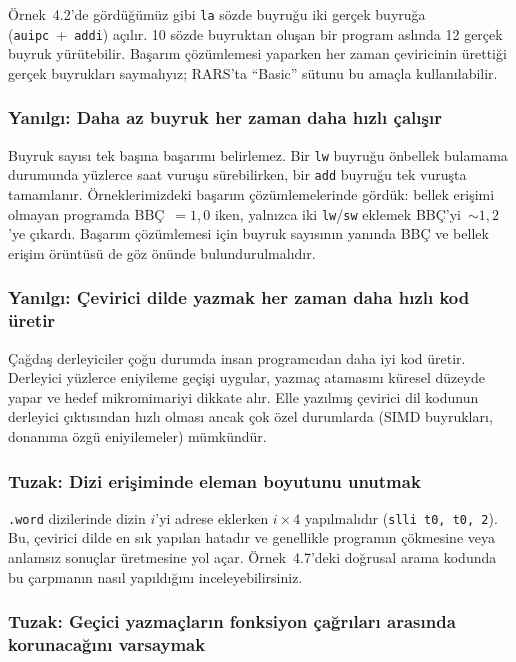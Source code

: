 Örnek~4.2'de gördüğümüz gibi \texttt{la} sözde buyruğu iki gerçek buyruğa (\texttt{auipc}~+~\texttt{addi}) açılır. 10 sözde buyruktan oluşan bir program aslında 12 gerçek buyruk yürütebilir. Başarım çözümlemesi yaparken her zaman çeviricinin ürettiği gerçek buyrukları saymalıyız; RARS'ta ``Basic'' sütunu bu amaçla kullanılabilir.

\subsubsection*{Yanılgı: Daha az buyruk her zaman daha hızlı çalışır}

Buyruk sayısı tek başına başarımı belirlemez. Bir \texttt{lw} buyruğu önbellek bulamama durumunda yüzlerce saat vuruşu sürebilirken, bir \texttt{add} buyruğu tek vuruşta tamamlanır. Örneklerimizdeki başarım çözümlemelerinde gördük: bellek erişimi olmayan programda BBÇ~$= 1{,}0$ iken, yalnızca iki \texttt{lw}/\texttt{sw} eklemek BBÇ'yi~$\sim 1{,}2$'ye çıkardı. Başarım çözümlemesi için buyruk sayısının yanında BBÇ ve bellek erişim örüntüsü de göz önünde bulundurulmalıdır.

\subsubsection*{Yanılgı: Çevirici dilde yazmak her zaman daha hızlı kod üretir}

Çağdaş derleyiciler çoğu durumda insan programcıdan daha iyi kod üretir. Derleyici yüzlerce eniyileme geçişi uygular, yazmaç atamasını küresel düzeyde yapar ve hedef mikromimariyi dikkate alır. Elle yazılmış çevirici dil kodunun derleyici çıktısından hızlı olması ancak çok özel durumlarda (SIMD buyrukları, donanıma özgü eniyilemeler) mümkündür.

\subsubsection*{Tuzak: Dizi erişiminde eleman boyutunu unutmak}

\texttt{.word} dizilerinde dizin $i$'yi adrese eklerken $i \times 4$ yapılmalıdır (\texttt{slli t0, t0, 2}). Bu, çevirici dilde en sık yapılan hatadır ve genellikle programın çökmesine veya anlamsız sonuçlar üretmesine yol açar. Örnek~4.7'deki doğrusal arama kodunda bu çarpmanın nasıl yapıldığını inceleyebilirsiniz.

\subsubsection*{Tuzak: Geçici yazmaçların fonksiyon çağrıları arasında korunacağını varsaymak}

